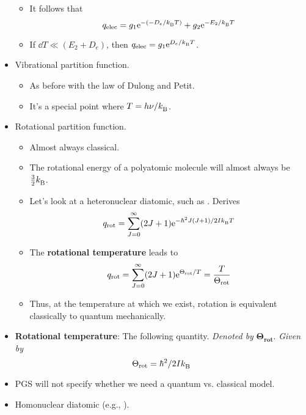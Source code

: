 \documentclass[../notes.tex]{subfiles}
\begin{document}
\begin{itemize}
\begin{itemize}
        \item It follows that
        \begin{equation*}
            q_\text{elec} = g_1\e[-(-D_e/\kB T)]+g_2\e[-E_2/\kB T]
        \end{equation*}
        \item If $\dd{T}\ll(E_2+D_e)$, then $q_\text{elec}=g_1\e[D_e/\kB T]$.
    \end{itemize}
    \item Vibrational partition function.
    \begin{itemize}
        \item As before with the law of Dulong and Petit.
        \item It's a special point where $T=h\nu/\kB$.
    \end{itemize}
    \item Rotational partition function.
    \begin{itemize}
        \item Almost always classical.
        \item The rotational energy of a polyatomic molecule will almost always be $\frac{3}{2}\kB$.
        \item Let's look at a heteronuclear diatomic, such as . Derives
        \begin{equation*}
            q_\text{rot} = \sum_{J=0}^\infty(2J+1)\e[-\hbar^2J(J+1)/2I\kB T]
        \end{equation*}
        \item The \textbf{rotational temperature} leads to
        \begin{equation*}
            q_\text{rot} = \sum_{J=0}^\infty(2J+1)\e[\Theta_\text{rot}/T] = \frac{T}{\Theta_\text{rot}}
        \end{equation*}
        \item Thus, at the temperature at which we exist, rotation is equivalent classically to quantum mechanically.
    \end{itemize}
    \item \textbf{Rotational temperature}: The following quantity. \emph{Denoted by} $\bm{\Theta_\textbf{rot}}$. \emph{Given by}
    \begin{equation*}
        \Theta_\text{rot} = \hbar^2/2I\kB
    \end{equation*}
    \item PGS will not specify whether we need a quantum vs. classical model.
    \item Homonuclear diatomic (e.g., ).

\end{itemize}
\end{document}
